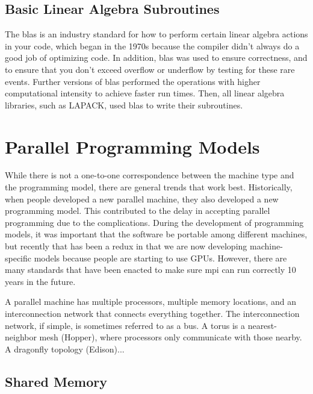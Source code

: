 \documentclass[10pt]{article}
\begin{document}
\begin{flushleft}
\subsection{Basic Linear Algebra Subroutines}

The \gls{blas} is an industry standard for how to perform certain linear algebra actions in your code, which began in the 1970s because the compiler didn't always do a good job of optimizing code. In addition, \gls{blas} was used to ensure correctness, and to ensure that you don't exceed overflow or underflow by testing for these rare events. Further versions of \gls{blas} performed the operations with higher computational intensity to achieve faster run times. Then, all linear algebra libraries, such as LAPACK, used \gls{blas} to write their subroutines.

\section{Parallel Programming Models}

While there is not a one-to-one correspondence between the machine type and the programming model, there are general trends that work best. Historically, when people developed a new parallel machine, they also developed a new programming model. This contributed to the delay in accepting parallel programming due to the complications. During the development of programming models, it was important that the software be portable among different machines, but recently that has been a redux in that we are now developing machine-specific models because people are starting to use GPUs. However, there are many standards that have been enacted to make sure \gls{mpi} can run correctly 10 years in the future.  

A parallel machine has multiple processors, multiple memory locations, and an interconnection network that connects everything together. The interconnection network, if simple, is sometimes referred to as a bus. A torus is a nearest-neighbor mesh (Hopper), where processors only communicate with those nearby. A dragonfly topology (Edison)...

\subsection{Shared Memory}


\end{flushleft}
\end{document}

